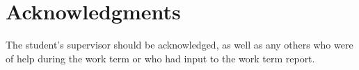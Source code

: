 \section*{Acknowledgments}
The student's supervisor should be acknowledged, as well as any others who were of help during the work term or who had input to the work term report.
